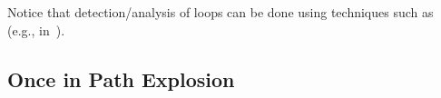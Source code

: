 Notice that detection/analysis of loops can be done using techniques such as~\cite{SGL-TOPLAS96} (e.g., in~\cite{CFB-ACSAC06}).

\subsection{Once in Path Explosion}

\begin{comment}
\begin{itemize}

  \item \cite{AEG-NDSS11}:
  \begin{itemize}
    \item {\em buggy-path-first}: priority to path that shown to contain errors (even if not exploitable)
    \item {\em loop exhaustion}: give priority to path that are exhausting a loop. In practice this can hit exploitable bugs (buffer overflows), but can prevent progress. Allow only one executor that is exhausting a loop, perform aggressive preconditioned symbolic execution.
  \end{itemize}

  \item {\em less covered code}: \cite{EXE-CCS06} uses a mixture of best-first and depth-first search. Best-first approach uses heuristic that give high priority to the path which is blocked at the line that has been executed the fewest number of times. The picked path is executed with DFS for a limited amount of time in order to avoid starvation. 

  \item \cite{KLEE-OSDI08} interleaves in a round robin fashion these strategies:
  \begin{itemize}
    \item {\em random path selection}: build a binary tree structure of all the state (each state is always created due to a fork from a parent). Assign same probability of being executed among states of the same subtree. Avoid starvation by given priority to states high in the tree.
    \item {\em coverage optimize search}: assign weights based on how much new code has been covered by a path. Pick up state randomly using weights as probability.
  \end{itemize}
  Each state is executed only for a time slice defined both as maximum number of instructions and as maximum amount of time.


\end{comment}
